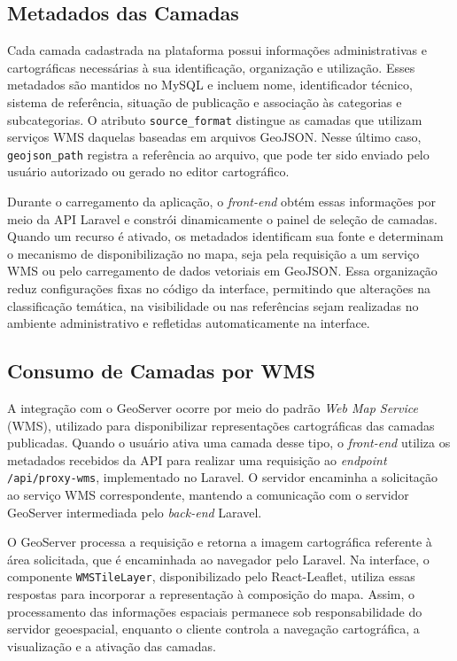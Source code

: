 \subsection{Metadados das Camadas}
\label{sec:metadados-camadas}

Cada camada cadastrada na plataforma possui informações administrativas e cartográficas necessárias à sua identificação, organização e utilização. Esses metadados são mantidos no MySQL e incluem nome, identificador técnico, sistema de referência, situação de publicação e associação às categorias e subcategorias. O atributo \texttt{source\_format} distingue as camadas que utilizam serviços WMS daquelas baseadas em arquivos GeoJSON. Nesse último caso, \texttt{geojson\_path} registra a referência ao arquivo, que pode ter sido enviado pelo usuário autorizado ou gerado no editor cartográfico.

Durante o carregamento da aplicação, o \textit{front-end} obtém essas informações por meio da API Laravel e constrói dinamicamente o painel de seleção de camadas. Quando um recurso é ativado, os metadados identificam sua fonte e determinam o mecanismo de disponibilização no mapa, seja pela requisição a um serviço WMS ou pelo carregamento de dados vetoriais em GeoJSON. Essa organização reduz configurações fixas no código da interface, permitindo que alterações na classificação temática, na visibilidade ou nas referências sejam realizadas no ambiente administrativo e refletidas automaticamente na interface.

\subsection{Consumo de Camadas por WMS}
\label{sec:consumo-wms}

A integração com o GeoServer ocorre por meio do padrão \textit{Web Map Service} (WMS), utilizado para disponibilizar representações cartográficas das camadas publicadas. Quando o usuário ativa uma camada desse tipo, o \textit{front-end} utiliza os metadados recebidos da API para realizar uma requisição ao \textit{endpoint} \texttt{/api/proxy-wms}, implementado no Laravel. O servidor encaminha a solicitação ao serviço WMS correspondente, mantendo a comunicação com o servidor GeoServer intermediada pelo \textit{back-end} Laravel.

O GeoServer processa a requisição e retorna a imagem cartográfica referente à área solicitada, que é encaminhada ao navegador pelo Laravel. Na interface, o componente \texttt{WMSTileLayer}, disponibilizado pelo React-Leaflet, utiliza essas respostas para incorporar a representação à composição do mapa. Assim, o processamento das informações espaciais permanece sob responsabilidade do servidor geoespacial, enquanto o cliente controla a navegação cartográfica, a visualização e a ativação das camadas.


